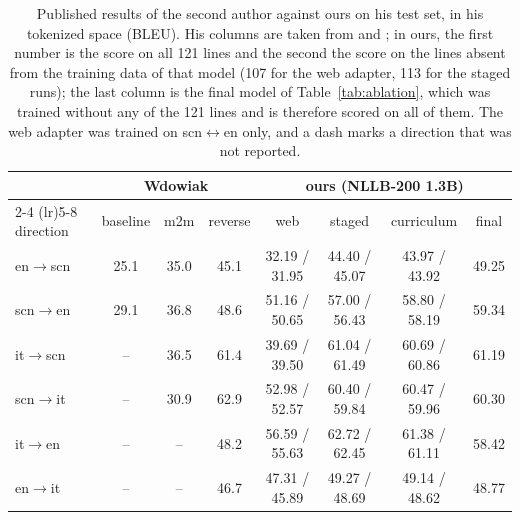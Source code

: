 \begin{table}[t]
\caption{Published results of the second author against ours on his test set, in his tokenized
space (BLEU). His columns are taken from \citet{wdowiak2022loresnmt} and \citet{wdowiakreverse};
in ours, the first number is the score on all 121 lines and the second the score on the lines
absent from the training data of that model (107 for the web adapter, 113 for the staged runs);
the last column is the final model of Table~\ref{tab:ablation}, which was trained without any
of the 121 lines and is therefore scored on all of them. The web adapter was trained on scn$\leftrightarrow$en only, and a dash marks a direction that was
not reported.}
\label{tab:sota}
\centering
\small
\setlength{\tabcolsep}{4pt}
\begin{tabular}{lccccccc}
\toprule
 & \multicolumn{3}{c}{Wdowiak} & \multicolumn{4}{c}{ours (NLLB-200 1.3B)} \\
\cmidrule(lr){2-4} \cmidrule(lr){5-8}
direction & baseline & m2m & reverse & web & staged & curriculum & final \\
\midrule
en$\rightarrow$scn & 25.1 & 35.0 & 45.1 & 32.19 / 31.95 & 44.40 / 45.07 & 43.97 / 43.92 & 49.25 \\
scn$\rightarrow$en & 29.1 & 36.8 & 48.6 & 51.16 / 50.65 & 57.00 / 56.43 & 58.80 / 58.19 & 59.34 \\
it$\rightarrow$scn & --   & 36.5 & 61.4 & 39.69 / 39.50 & 61.04 / 61.49 & 60.69 / 60.86 & 61.19 \\
scn$\rightarrow$it & --   & 30.9 & 62.9 & 52.98 / 52.57 & 60.40 / 59.84 & 60.47 / 59.96 & 60.30 \\
it$\rightarrow$en  & --   & --   & 48.2 & 56.59 / 55.63 & 62.72 / 62.45 & 61.38 / 61.11 & 58.42 \\
en$\rightarrow$it  & --   & --   & 46.7 & 47.31 / 45.89 & 49.27 / 48.69 & 49.14 / 48.62 & 48.77 \\
\bottomrule
\end{tabular}
\end{table}
